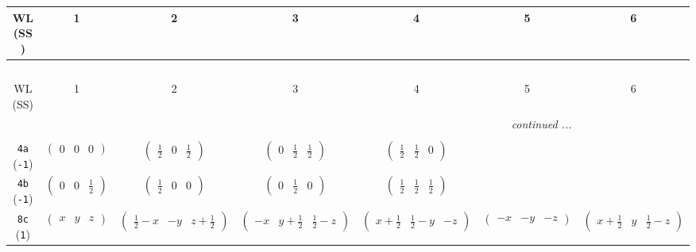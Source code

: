 \documentclass[fleqn,9pt,landscape]{jsarticle}
\begin{document}
\begin{center}
\renewcommand{\arraystretch}{1.2}
\begin{longtable}{ccccccc}
 \hline \hline
WL (SS) & 1 & 2 & 3 & 4 & 5 & 6 \\ \hline \endfirsthead

\multicolumn{6}{l}{\tablename\ \thetable{}} \\
 \hline \hline
WL (SS) & 1 & 2 & 3 & 4 & 5 & 6 \\ \hline \endhead

 \hline \hline
\multicolumn{6}{r}{\footnotesize\it continued ...} \\ \endfoot

 \hline \hline
\multicolumn{6}{r}{} \\ \endlastfoot

{\tt 4a} ({\tt -1}) & $ \begin{pmatrix} 0 & 0 & 0 \end{pmatrix} $ & $ \begin{pmatrix} \frac{1}{2} & 0 & \frac{1}{2} \end{pmatrix} $ & $ \begin{pmatrix} 0 & \frac{1}{2} & \frac{1}{2} \end{pmatrix} $ & $ \begin{pmatrix} \frac{1}{2} & \frac{1}{2} & 0 \end{pmatrix} $ & $  $ & $  $ \\ \hline
{\tt 4b} ({\tt -1}) & $ \begin{pmatrix} 0 & 0 & \frac{1}{2} \end{pmatrix} $ & $ \begin{pmatrix} \frac{1}{2} & 0 & 0 \end{pmatrix} $ & $ \begin{pmatrix} 0 & \frac{1}{2} & 0 \end{pmatrix} $ & $ \begin{pmatrix} \frac{1}{2} & \frac{1}{2} & \frac{1}{2} \end{pmatrix} $ & $  $ & $  $ \\ \hline
{\tt 8c} ({\tt 1}) & $ \begin{pmatrix} x & y & z \end{pmatrix} $ & $ \begin{pmatrix} \frac{1}{2} - x & - y & z + \frac{1}{2} \end{pmatrix} $ & $ \begin{pmatrix} - x & y + \frac{1}{2} & \frac{1}{2} - z \end{pmatrix} $ & $ \begin{pmatrix} x + \frac{1}{2} & \frac{1}{2} - y & - z \end{pmatrix} $ & $ \begin{pmatrix} - x & - y & - z \end{pmatrix} $ & $ \begin{pmatrix} x + \frac{1}{2} & y & \frac{1}{2} - z \end{pmatrix} $ \\

\end{longtable}
\end{center}
\end{document}
